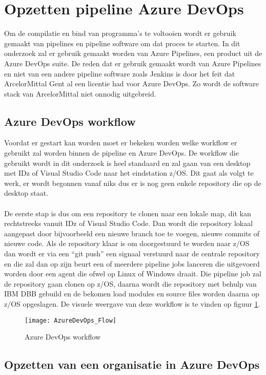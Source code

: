 \pagebreak

\section{Opzetten pipeline Azure DevOps}
Om de compilatie en bind van programma's te voltooien wordt er gebruik gemaakt van pipelines en pipeline software om dat proces te starten. In dit onderzoek zal er gebruik gemaakt worden van Azure Pipelines, een product uit de Azure DevOps suite. De reden dat er gebruik gemaakt wordt van Azure Pipelines en niet van een andere pipeline software zoals Jenkins is door het feit dat ArcelorMittal Gent al een licentie had voor Azure DevOps. Zo wordt de software stack van ArcelorMittal niet onnodig uitgebreid. 

\subsection{Azure DevOps workflow}
Voordat er gestart kan worden moet er bekeken worden welke workflow er gebruikt zal worden binnen de pipeline en Azure DevOps. De workflow die gebruikt wordt in dit onderzoek is heel standaard en zal gaan van een desktop met IDz of Visual Studio Code naar het eindstation z/OS. Dit gaat als volgt te werk, er wordt begonnen vanaf niks dus er is nog geen enkele repository die op de desktop staat. 
\\ \\
De eerste stap is dus om een repository te clonen naar een lokale map, dit kan rechtstreeks vanuit IDz of Visual Studio Code. Dan wordt die repository lokaal aangepast door bijvoorbeeld een nieuwe branch toe te voegen, nieuwe commits of nieuwe code. Als de repository klaar is om doorgestuurd te worden naar z/OS dan wordt er via een ``git push'' een signaal verstuurd naar de centrale repository en die zal dan op zijn beurt een of meerdere pipeline jobs lanceren die uitgevoerd worden door een agent die ofwel op Linux of Windows draait. Die pipeline job zal de repository gaan clonen op z/OS, daarna wordt die repository met behulp van IBM DBB gebuild en de bekomen load modules en source files worden daarna op z/OS opgeslagen. De visuele weergave van deze workflow is te vinden op figuur \ref{fig:azure devops flow}.
\begin{figure}[h]
    \centering
    \texttt{[image: AzureDevOps\_Flow]}
    \caption{Azure DevOps workflow}
    \label{fig:azure devops flow}
\end{figure}

\subsection{Opzetten van een organisatie in Azure DevOps}








